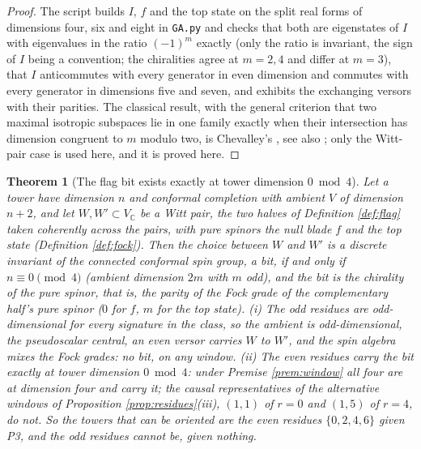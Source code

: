 \documentclass[11pt]{article}
\newtheorem{theorem}{Theorem}[section]
\theoremstyle{definition}
\newcommand{\C}{\mathbb{C}}
\begin{document}
\begin{proof}
The script builds $I$, $f$ and the top state on the split real forms of dimensions four, six and eight in \texttt{GA.py} and checks that both are eigenstates of $I$ with eigenvalues in the ratio $(-1)^{m}$ exactly (only the ratio is invariant, the sign of $I$ being a convention; the chiralities agree at $m = 2, 4$ and differ at $m = 3$), that $I$ anticommutes with every generator in even dimension and commutes with every generator in dimensions five and seven, and exhibits the exchanging versors with their parities. The classical result, with the general criterion that two maximal isotropic subspaces lie in one family exactly when their intersection has dimension congruent to $m$ modulo two, is Chevalley's \cite[Ch.~III, \S1]{Chevalley1954}, see also \cite{LawsonMichelsohn1989}; only the Witt-pair case is used here, and it is proved here.
\end{proof}

\begin{theorem}[The flag bit exists exactly at tower dimension $0 \bmod 4$]\label{thm:paritybit}
Let a tower have dimension $n$ and conformal completion with ambient $V$ of dimension $n + 2$, and let $W, W' \subset V_{\C}$ be a Witt pair, the two halves of Definition \ref{def:flag} taken coherently across the pairs, with pure spinors the null blade $f$ and the top state (Definition \ref{def:fock}). Then the choice between $W$ and $W'$ is a discrete invariant of the connected conformal spin group, a \emph{bit}, if and only if $n \equiv 0 \pmod 4$ (ambient dimension $2m$ with $m$ odd), and the bit is the chirality of the pure spinor, that is, the parity of the Fock grade of the complementary half's pure spinor ($0$ for $f$, $m$ for the top state). (i) The odd residues are odd-dimensional for every signature in the class, so the ambient is odd-dimensional, the pseudoscalar central, an even versor carries $W$ to $W'$, and the spin algebra mixes the Fock grades: no bit, on any window. (ii) The even residues carry the bit exactly at tower dimension $0 \bmod 4$: under Premise \ref{prem:window} all four are at dimension four and carry it; the causal representatives of the alternative windows of Proposition \ref{prop:residues}(iii), $(1,1)$ of $r = 0$ and $(1,5)$ of $r = 4$, do not. So the towers that can be oriented are the even residues $\{0, 2, 4, 6\}$ given P3, and the odd residues cannot be, given nothing.
\end{theorem}
\end{document}
